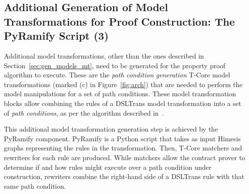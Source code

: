 

\subsection{Additional Generation of Model Transformations for Proof
Construction: The PyRamify Script (3)}

Additional model transformations, other than the ones described in
Section~\ref{sec:gen_models_mt}, need to be generated for the property proof
algorithm to execute. These are the \emph{path condition generation} T-Core
model transformations (marked (c) in Figure~\ref{fig:arch}) that are needed to
perform the model manipulations for a set of path conditions. These model
transformation blocks allow combining the rules of a DSLTrans model
transformation into a set of \emph{path conditions}, as per the algorithm
described in~\cite{Lucio2014}.

This additional model transformation generation step is achieved by the PyRamify
component. PyRamify is a Python script that takes as input Himesis graphs
representing the rules in the transformation. Then, T-Core matchers and
rewriters for each rule are produced. While matchers allow the contract prover to determine
if and how rules might execute over a path condition under construction,
rewriters combine the right-hand side of a DSLTrans rule with that same path
condition.


% 

